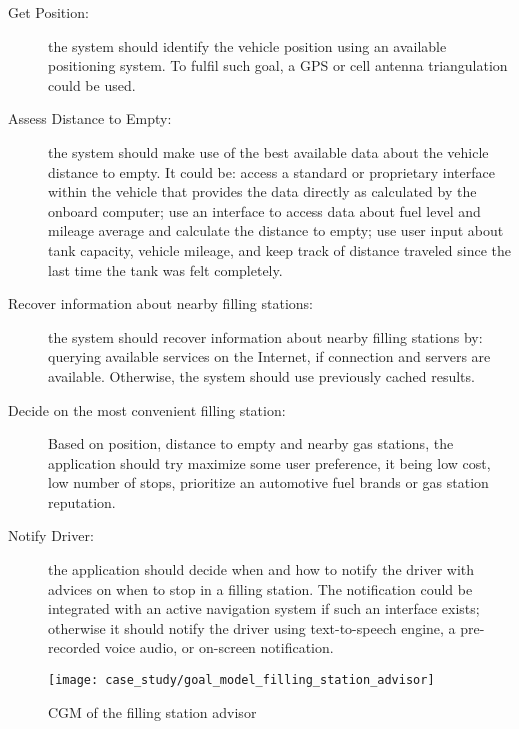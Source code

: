 \begin{description}
  \item[Get Position:]
  the system should identify the vehicle position using an available positioning system. To fulfil such goal, a GPS or cell antenna triangulation could be used.

  \item[Assess Distance to Empty:]
  the system should make use of the best available data about the vehicle distance to empty. It could be: access a standard or proprietary interface within the vehicle that provides the data directly as calculated by the onboard computer; use an interface to access data about fuel level and mileage average and calculate the distance to empty; use user input about tank capacity, vehicle mileage, and keep track of distance traveled since the last time the tank was felt completely.

  \item[Recover information about nearby filling stations:]
  the system should recover information about nearby filling stations by: querying available services on the Internet, if connection and servers are available. Otherwise, the system should use previously cached results.

  \item[Decide on the most convenient filling station:]
  Based on position, distance to empty and nearby gas stations, the application should try maximize some user preference, it being low cost, low number of stops, prioritize an automotive fuel brands or gas station reputation.

  \item[Notify Driver:] the application should decide when and how to notify the driver with advices on when to stop in a filling station. The notification could be integrated with an active navigation system if such an interface exists; otherwise it should notify the driver using text-to-speech engine, a pre-recorded voice audio, or on-screen notification.

\end{description}


\begin{figure*}[!htb]
 \centering
 \texttt{[image: case\_study/goal\_model\_filling\_station\_advisor]}
 \caption{CGM of the filling station advisor}
\label{fig:goal_model_filling_station_advisor}
\end{figure*}

